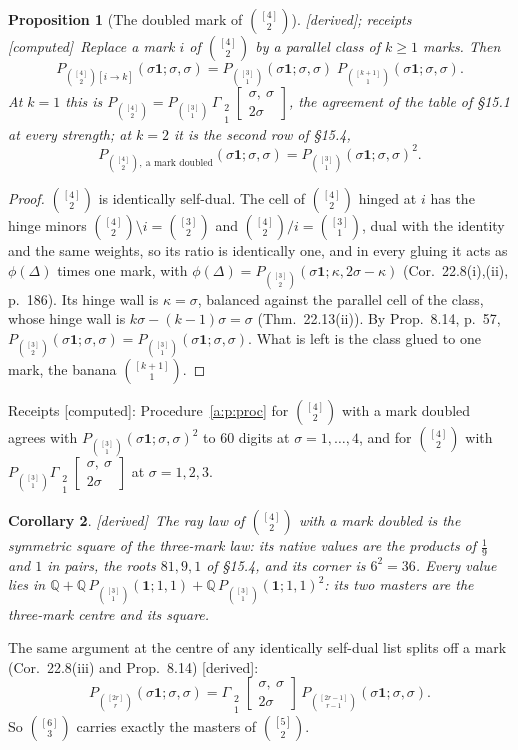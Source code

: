 \documentclass[11pt]{article}
\newcommand{\one}{\mathbf 1}
\newcommand{\Gst}[4]{\Gamma_{\substack{#1\\#2}}\!\begin{bmatrix}#3\\#4\end{bmatrix}}
\theoremstyle{plain}
\newtheorem{proposition}{Proposition}[section]
\newtheorem{corollary}[proposition]{Corollary}
\theoremstyle{definition}
\theoremstyle{remark}
\newcommand{\derived}{\textup{[derived]}}
\newcommand{\computed}{\textup{[computed]}}
\begin{document}
\begin{proposition}[The doubled mark of $\binom{[4]}2$]\label{a:p:u24}\derived; receipts \computed\
Replace a mark $i$ of $\binom{[4]}2$ by a parallel class of $k\ge1$ marks. Then
\[
P_{\binom{[4]}2[i\to k]}(\sigma\one;\sigma,\sigma)=P_{\binom{[3]}1}(\sigma\one;\sigma,\sigma)\;P_{\binom{[k+1]}1}(\sigma\one;\sigma,\sigma).
\]
At $k=1$ this is $P_{\binom{[4]}2}=P_{\binom{[3]}1}\,\Gst21{\sigma,\ \sigma}{2\sigma}$, the agreement of the table of \S15.1 at every strength; at $k=2$ it is the second row of \S15.4,
\[
P_{\binom{[4]}2,\ \text{a mark doubled}}(\sigma\one;\sigma,\sigma)=P_{\binom{[3]}1}(\sigma\one;\sigma,\sigma)^2 .
\]
\end{proposition}

\begin{proof}
$\binom{[4]}2$ is identically self-dual. The cell of $\binom{[4]}2$ hinged at $i$ has the hinge minors $\binom{[4]}2\setminus i=\binom{[3]}2$ and $\binom{[4]}2/i=\binom{[3]}1$, dual with the identity and the same weights, so its ratio is identically one, and in every gluing it acts as $\phi(\Delta)$ times one mark, with $\phi(\Delta)=P_{\binom{[3]}2}(\sigma\one;\kappa,2\sigma-\kappa)$ (Cor.~22.8(i),(ii), p.~186). Its hinge wall is $\kappa=\sigma$, balanced against the parallel cell of the class, whose hinge wall is $k\sigma-(k-1)\sigma=\sigma$ (Thm.~22.13(ii)). By Prop.~8.14, p.~57, $P_{\binom{[3]}2}(\sigma\one;\sigma,\sigma)=P_{\binom{[3]}1}(\sigma\one;\sigma,\sigma)$. What is left is the class glued to one mark, the banana $\binom{[k+1]}1$.
\end{proof}

\noindent Receipts \computed: Procedure~\ref{a:p:proc} for $\binom{[4]}2$ with a mark doubled agrees with $P_{\binom{[3]}1}(\sigma\one;\sigma,\sigma)^2$ to $60$ digits at $\sigma=1,\dots,4$, and for $\binom{[4]}2$ with $P_{\binom{[3]}1}\Gst21{\sigma,\ \sigma}{2\sigma}$ at $\sigma=1,2,3$.

\begin{corollary}\label{a:c:u24}\derived\
The ray law of $\binom{[4]}2$ with a mark doubled is the symmetric square of the three-mark law: its native values are the products of $\frac19$ and $1$ in pairs, the roots $81,9,1$ of \S15.4, and its corner is $6^2=36$. Every value lies in $\mathbb Q+\mathbb Q\,P_{\binom{[3]}1}(\one;1,1)+\mathbb Q\,P_{\binom{[3]}1}(\one;1,1)^2$: its two masters are the three-mark centre and its square.
\end{corollary}

The same argument at the centre of any identically self-dual list splits off a mark (Cor.~22.8(iii) and Prop.~8.14) \derived:
\[
P_{\binom{[2r]}r}(\sigma\one;\sigma,\sigma)=\Gst21{\sigma,\ \sigma}{2\sigma}\,P_{\binom{[2r-1]}{r-1}}(\sigma\one;\sigma,\sigma).
\]
So $\binom{[6]}3$ carries exactly the masters of $\binom{[5]}2$.
\end{document}
